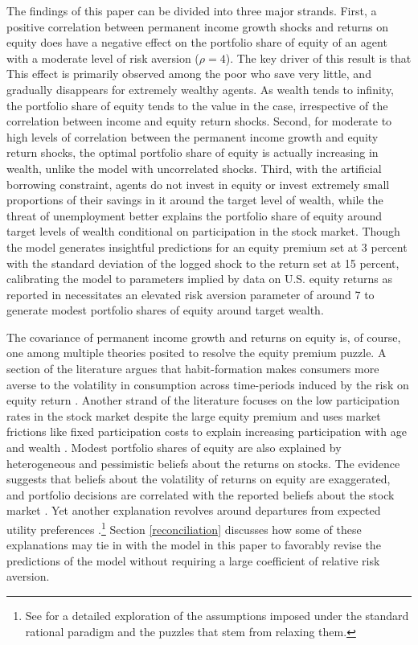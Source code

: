 The findings of this paper can be divided into three major strands. First, a positive correlation between permanent income growth shocks and returns on equity does have a negative effect on the portfolio share of equity of an agent with a moderate level of risk aversion ($\rho = 4$). The key driver of this result is that  This effect is primarily observed among the poor who save very little, and gradually disappears for extremely wealthy agents. As wealth tends to infinity, the portfolio share of equity tends to the value in the \citet{Merton1969,Samuelson1969} case, irrespective of the correlation between income and equity return shocks. Second, for moderate to high levels of correlation between the permanent income growth and equity return shocks, the optimal portfolio share of equity is actually increasing in wealth, unlike the model with uncorrelated shocks. Third, with the artificial borrowing constraint, agents do not invest in equity or invest extremely small proportions of their savings in it around the target level of wealth, while the threat of unemployment better explains the portfolio share of equity around target levels of wealth conditional on participation in the stock market. Though the model generates insightful predictions for an equity premium set at 3 percent with the standard deviation of the logged shock to the return set at 15 percent, calibrating the model to parameters implied by data on U.S. equity returns as reported in \citet{Mehra2006} necessitates an elevated risk aversion parameter of around 7 to generate modest portfolio shares of equity around target wealth. 

The covariance of permanent income growth and returns on equity is, of course, one among multiple theories posited to resolve the equity premium puzzle. A section of the literature argues that habit-formation makes consumers more averse to the volatility in consumption across time-periods induced by the risk on equity return \citep{Constantinides1990, Abel1990, Detemple1991, Campbell1999, Otrok2002}. Another strand of the literature focuses on the low participation rates in the stock market despite the large equity premium and uses market frictions like fixed participation costs to explain increasing participation with age and wealth \citep{Cocco2005, Gomes2005, Alan2006, Khorunzhina2013, Fagereng2017}. Modest portfolio shares of equity are also explained by heterogeneous and pessimistic beliefs about the returns on stocks. The evidence suggests that beliefs about the volatility of returns on equity are exaggerated, and portfolio decisions are correlated with the reported beliefs about the stock market \citep{Dominitz2007, Hurd2011, Amromin2014, Ameriks2020, Mateo2024}. Yet another explanation revolves around departures from expected utility preferences \citep{Haliassos1995,Haliassos2001, Routledge2010, Schreindorfer2020}.\footnote{See \citet{Barucci2003} for a detailed exploration of the assumptions imposed under the standard rational paradigm and the puzzles that stem from relaxing them.} Section \ref{reconciliation} discusses how some of these explanations may tie in with the model in this paper to favorably revise the predictions of the model without requiring a large coefficient of relative risk aversion.

